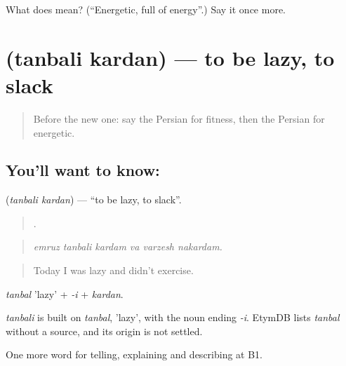 \begin{tcolorbox}[breakable,colback=teal!4,colframe=teal!35!black,title={Before you move on}]
What does  mean? (\textquotedblleft{}Energetic, full of energy\textquotedblright{}.) Say it once more.
\end{tcolorbox}
\section[\texorpdfstring{\fa{تنبلی} \fa{کردن} (tanbali kardan)}{تنبلی کردن (tanbali kardan)}]{  (tanbali kardan) — to be lazy, to slack}

\label{lesson:FA-C516-tanbali-kardan}



\begin{quote}
Before the new one: say the Persian for fitness, then the Persian for energetic.
\end{quote}

\subsection*{You'll want to know:  }
\textbf{ } (\emph{tanbali kardan}) — \textquotedblleft{}to be lazy, to slack\textquotedblright{}.

\begin{quote}
     .
\end{quote}

\begin{quote}
\emph{emruz tanbali kardam va varzesh nakardam.}
\end{quote}

\begin{quote}
Today I was lazy and didn't exercise.
\end{quote}

\emph{tanbal} 'lazy' + \emph{-i} + \emph{kardan}.

\begin{cousinweb}
\emph{tanbali} is built on \emph{tanbal}, 'lazy', with the noun ending \emph{-i}. EtymDB lists \emph{tanbal} without a source, and its origin is not settled.
\end{cousinweb}

\begin{grammarlens}[title={What you've built}]
One more word for telling, explaining and describing at B1.
\end{grammarlens}

